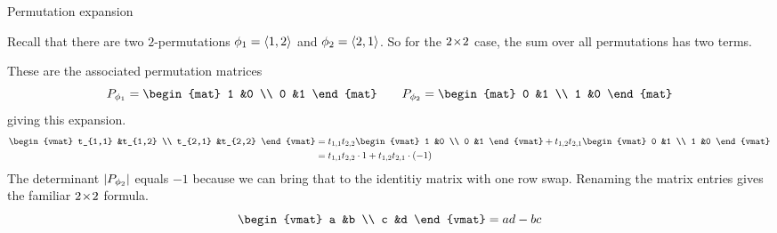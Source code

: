 \documentclass[10pt,t,serif,professionalfont]{beamer}
\begin{document}
\begin{frame}{Permutation expansion}
\df[df:PermutationExpansion]

\pause
\medskip
{}
\end{frame}
\begin{frame}
\ex
Recall that there are two $2$-permutations
\( \phi_1=\langle1,2\rangle \) and \( \phi_2=\langle2,1\rangle \).
So for the $2 \! \times \! 2$ case, the sum over all permutations has two terms.

\pause
These are the associated permutation matrices
\begin{equation*}
  P_{\phi_1}=
  \begin{mat}
    1 &0 \\
    0 &1
  \end{mat}
  \qquad
  P_{\phi_2}=
  \begin{mat}
    0 &1 \\
    1 &0
  \end{mat}
\end{equation*}
\pause
giving this expansion.
\begin{align*}
  \begin{vmat}
    t_{1,1}  &t_{1,2} \\
    t_{2,1}  &t_{2,2}
  \end{vmat}
  &=
  t_{1,1}t_{2,2}
  \begin{vmat}
    1  &0 \\
    0  &1
  \end{vmat}               
  +
  t_{1,2}t_{2,1}
  \begin{vmat}
    0  &1 \\
    1  &0
  \end{vmat}               \\
  &=
  t_{1,1}t_{2,2}\cdot 1
  +
  t_{1,2}t_{2,1}\cdot (-1)
\end{align*}
The determinant $\deter{P_{\phi_2}}$ equals $-1$ because we can bring that to 
the identitiy matrix with one row swap.
\pause
Renaming the matrix entries gives the familiar $2 \! \times \! 2$ formula.
\begin{equation*}
  \begin{vmat}
    a  &b  \\
    c  &d
  \end{vmat}
  =ad-bc
\end{equation*}
\end{frame}
\end{document}
